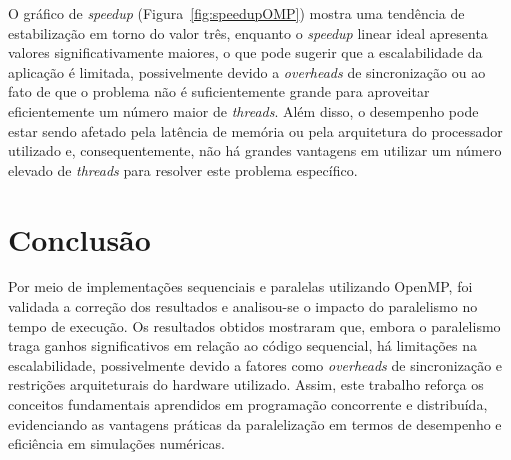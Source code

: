 \documentclass[12pt]{article}
\begin{document}
O gráfico de \textit{speedup} (Figura~\ref{fig:speedupOMP}) mostra uma
tendência de estabilização em torno do valor três, enquanto o \textit{speedup}
linear ideal apresenta valores significativamente maiores, o que pode sugerir
que a escalabilidade da aplicação é limitada, possivelmente devido a
\textit{overheads} de sincronização ou ao fato de que o problema não é
suficientemente grande para aproveitar eficientemente um número maior de
\textit{threads}. Além disso, o desempenho pode estar sendo afetado pela
latência de memória ou pela arquitetura do processador utilizado e,
consequentemente, não há grandes vantagens em utilizar um número elevado de
\textit{threads} para resolver este problema específico.

\section{Conclusão}
Por meio de implementações sequenciais e paralelas utilizando OpenMP, foi
validada a correção dos resultados e analisou-se o impacto do paralelismo no
tempo de execução. Os resultados obtidos mostraram que, embora o paralelismo
traga ganhos significativos em relação ao código sequencial, há limitações na
escalabilidade, possivelmente devido a fatores como \textit{overheads} de
sincronização e restrições arquiteturais do hardware utilizado. Assim, este
trabalho reforça os conceitos fundamentais aprendidos em programação
concorrente e distribuída, evidenciando as vantagens práticas da paralelização
em termos de desempenho e eficiência em simulações numéricas.



\nocite{*}
\end{document}
